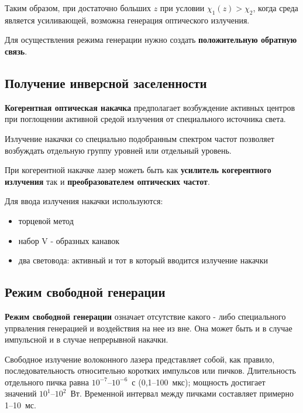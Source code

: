\documentclass[12pt]{article}
\begin{document}
Таким образом, при достаточно больших $z$ при условии $\chi_1(z) > \chi_2$, когда среда является усиливающей, возможна генерация оптического излучения.

\par

Для осуществления режима генерации нужно создать \textbf{положительную обратную связь}.


\subsection{Получение инверсной заселенности}

\textbf{Когерентная оптическая накачка} предполагает возбуждение активных центров при поглощении активной средой излучения от специального источника света.

Излучение накачки со специально подобранным спектром частот позволяет возбуждать отдельную группу уровней или отдельный уровень.

При когерентной накачке лазер можеть быть как \textbf{усилитель когерентного излучения} так и \textbf{преобразователем оптических частот}.

\par

Для ввода излучения накачки используются:

\begin{itemize}
    \item торцевой метод
    \item набор V - образных канавок
    \item два световода: активный и тот в который вводится излучение накачки
\end{itemize}

\newpage

\subsection{Режим свободной генерации}

\textbf{Режим свободной генерации} означает отсутствие какого - либо специального упрваления генерацией и воздействия на нее из вне. Она может быть и в случае импульсной и в случае непрерывной накачки.

\par

Свободное излучение волоконного лазера представляет собой, как правило, последовательность относительно коротких импульсов или пичков. Длительность отдельного пичка равна $10^{-7}$--$10^{-6}$~с (0,1--100~мкс); мощность достигает значений $10^1$--$10^2$~Вт. Временной интервал между пичками составляет примерно 1--10~мс.
\end{document}
